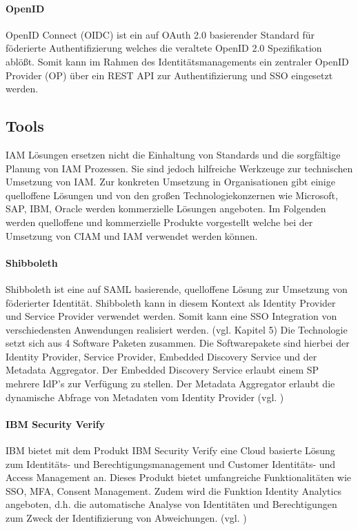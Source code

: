 \documentclass[11pt]{article}
\begin{document}
\paragraph{OpenID}
OpenID Connect (OIDC) ist ein auf OAuth 2.0 basierender Standard für föderierte Authentifizierung welches die veraltete OpenID 2.0 Spezifikation ablößt. Somit kann im Rahmen des Identitätsmanagements ein zentraler OpenID Provider (OP) über ein REST API zur Authentifizierung und SSO eingesetzt werden.~\cite{naik2017choice}
\subsection{Tools}
IAM Lösungen ersetzen nicht die Einhaltung von Standards und die sorgfältige Planung von IAM Prozessen. Sie sind jedoch hilfreiche Werkzeuge zur technischen Umsetzung von IAM. Zur konkreten Umsetzung in Organisationen gibt einige quelloffene Lösungen und von den großen Technologiekonzernen wie Microsoft, SAP, IBM, Oracle werden kommerzielle Lösungen angeboten. Im Folgenden werden quelloffene und kommerzielle Produkte vorgestellt welche bei der Umsetzung von CIAM und IAM verwendet werden können.
\paragraph{Shibboleth}
Shibboleth ist eine auf SAML basierende, quelloffene Lösung zur Umsetzung von föderierter Identität. Shibboleth kann in diesem Kontext als Identity Provider und Service Provider verwendet werden. Somit kann eine SSO Integration von verschiedensten Anwendungen realisiert werden. (vgl. \cite{kamal2015shibboleth} Kapitel 5) Die Technologie setzt sich aus 4 Software Paketen zusammen. Die Softwarepakete sind hierbei der Identity Provider, Service Provider, Embedded Discovery Service und der Metadata Aggregator. Der Embedded Discovery Service erlaubt einem SP mehrere IdP's zur Verfügung zu stellen. Der Metadata Aggregator erlaubt die dynamische Abfrage von Metadaten vom Identity Provider (vgl. \cite{shibboleth2024software})
\paragraph{IBM Security Verify}
IBM bietet mit dem Produkt \glqq{}IBM Security Verify\grqq{} eine Cloud basierte Lösung zum Identitäts- und Berechtigungsmanagement und Customer Identitäts- und Access Management an. Dieses Produkt bietet umfangreiche Funktionalitäten wie SSO, MFA, Consent Management. Zudem wird die Funktion Identity Analytics angeboten, d.h. die automatische Analyse von Identitäten und Berechtigungen zum Zweck der Identifizierung von Abweichungen. (vgl. \cite{ibm2024verify})
\end{document}
